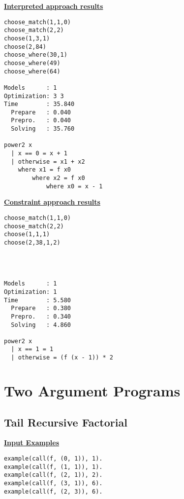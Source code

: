 \begin{multicols*}{2}
\underline{\textbf{Interpreted approach results}}
\begin{lstlisting}
choose_match(1,1,0) 
choose_match(2,2) 
choose(1,3,1) 
choose(2,84) 
choose_where(30,1) 
choose_where(49) 
choose_where(64) 

Models      : 1     
Optimization: 3 3 
Time        : 35.840
  Prepare   : 0.040
  Prepro.   : 0.040
  Solving   : 35.760

power2 x
  | x == 0 = x + 1
  | otherwise = x1 + x2
  	where x1 = f x0
  		where x2 = f x0
  			where x0 = x - 1
\end{lstlisting}
\vspace*{\fill}
\columnbreak
\underline{\textbf{Constraint approach results}}
\begin{lstlisting}
choose_match(1,1,0) 
choose_match(2,2)
choose(1,1,1)
choose(2,38,1,2) 
 
 
 
 
Models      : 1  
Optimization: 1 
Time        : 5.580
  Prepare   : 0.380
  Prepro.   : 0.340
  Solving   : 4.860

power2 x
  | x == 1 = 1
  | otherwise = (f (x - 1)) * 2 
\end{lstlisting}
\end{multicols*}
\pagebreak
\section{Two Argument Programs}

\subsection{Tail Recursive Factorial}
\underline{\textbf{Input Examples}}
\begin{lstlisting}
example(call(f, (0, 1)), 1).
example(call(f, (1, 1)), 1).
example(call(f, (2, 1)), 2).
example(call(f, (3, 1)), 6).
example(call(f, (2, 3)), 6).
\end{lstlisting}

